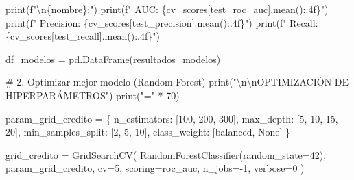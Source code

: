 \documentclass[
  doc,
  floatsintext,
  longtable,
  a4paper,
  nolmodern,
  notxfonts,
  notimes,
  12pt,
  colorlinks=true,linkcolor=blue,citecolor=blue,urlcolor=blue]{apa7}
\newenvironment{Shaded}{\begin{snugshade}}{\end{snugshade}}
\newcommand{\BuiltInTok}[1]{\textcolor[rgb]{0.00,0.23,0.31}{#1}}
\newcommand{\CharTok}[1]{\textcolor[rgb]{0.13,0.47,0.30}{#1}}
\newcommand{\CommentTok}[1]{\textcolor[rgb]{0.37,0.37,0.37}{#1}}
\newcommand{\DecValTok}[1]{\textcolor[rgb]{0.68,0.00,0.00}{#1}}
\newcommand{\NormalTok}[1]{\textcolor[rgb]{0.00,0.23,0.31}{#1}}
\newcommand{\OperatorTok}[1]{\textcolor[rgb]{0.37,0.37,0.37}{#1}}
\newcommand{\SpecialCharTok}[1]{\textcolor[rgb]{0.37,0.37,0.37}{#1}}
\newcommand{\SpecialStringTok}[1]{\textcolor[rgb]{0.13,0.47,0.30}{#1}}
\newcommand{\StringTok}[1]{\textcolor[rgb]{0.13,0.47,0.30}{#1}}
\newcommand{\VariableTok}[1]{\textcolor[rgb]{0.07,0.07,0.07}{#1}}
\begin{document}
\begin{Shaded}
\begin{Highlighting}[]
    \BuiltInTok{print}\NormalTok{(}\SpecialStringTok{f"}\CharTok{\textbackslash{}n}\SpecialCharTok{\{}\NormalTok{nombre}\SpecialCharTok{\}}\SpecialStringTok{:"}\NormalTok{)}
    \BuiltInTok{print}\NormalTok{(}\SpecialStringTok{f"  AUC: }\SpecialCharTok{\{}\NormalTok{cv\_scores[}\StringTok{\textquotesingle{}test\_roc\_auc\textquotesingle{}}\NormalTok{]}\SpecialCharTok{.}\NormalTok{mean()}\SpecialCharTok{:.4f\}}\SpecialStringTok{"}\NormalTok{)}
    \BuiltInTok{print}\NormalTok{(}\SpecialStringTok{f"  Precision: }\SpecialCharTok{\{}\NormalTok{cv\_scores[}\StringTok{\textquotesingle{}test\_precision\textquotesingle{}}\NormalTok{]}\SpecialCharTok{.}\NormalTok{mean()}\SpecialCharTok{:.4f\}}\SpecialStringTok{"}\NormalTok{)}
    \BuiltInTok{print}\NormalTok{(}\SpecialStringTok{f"  Recall: }\SpecialCharTok{\{}\NormalTok{cv\_scores[}\StringTok{\textquotesingle{}test\_recall\textquotesingle{}}\NormalTok{]}\SpecialCharTok{.}\NormalTok{mean()}\SpecialCharTok{:.4f\}}\SpecialStringTok{"}\NormalTok{)}

\NormalTok{df\_modelos }\OperatorTok{=}\NormalTok{ pd.DataFrame(resultados\_modelos)}

\CommentTok{\# 2. Optimizar mejor modelo (Random Forest)}
\BuiltInTok{print}\NormalTok{(}\StringTok{"}\CharTok{\textbackslash{}n\textbackslash{}n}\StringTok{OPTIMIZACIÓN DE HIPERPARÁMETROS"}\NormalTok{)}
\BuiltInTok{print}\NormalTok{(}\StringTok{"="} \OperatorTok{*} \DecValTok{70}\NormalTok{)}

\NormalTok{param\_grid\_credito }\OperatorTok{=}\NormalTok{ \{}
    \StringTok{\textquotesingle{}n\_estimators\textquotesingle{}}\NormalTok{: [}\DecValTok{100}\NormalTok{, }\DecValTok{200}\NormalTok{, }\DecValTok{300}\NormalTok{],}
    \StringTok{\textquotesingle{}max\_depth\textquotesingle{}}\NormalTok{: [}\DecValTok{5}\NormalTok{, }\DecValTok{10}\NormalTok{, }\DecValTok{15}\NormalTok{, }\DecValTok{20}\NormalTok{],}
    \StringTok{\textquotesingle{}min\_samples\_split\textquotesingle{}}\NormalTok{: [}\DecValTok{2}\NormalTok{, }\DecValTok{5}\NormalTok{, }\DecValTok{10}\NormalTok{],}
    \StringTok{\textquotesingle{}class\_weight\textquotesingle{}}\NormalTok{: [}\StringTok{\textquotesingle{}balanced\textquotesingle{}}\NormalTok{, }\VariableTok{None}\NormalTok{]}
\NormalTok{\}}

\NormalTok{grid\_credito }\OperatorTok{=}\NormalTok{ GridSearchCV(}
\NormalTok{    RandomForestClassifier(random\_state}\OperatorTok{=}\DecValTok{42}\NormalTok{),}
\NormalTok{    param\_grid\_credito,}
\NormalTok{    cv}\OperatorTok{=}\DecValTok{5}\NormalTok{,}
\NormalTok{    scoring}\OperatorTok{=}\StringTok{\textquotesingle{}roc\_auc\textquotesingle{}}\NormalTok{,}
\NormalTok{    n\_jobs}\OperatorTok{={-}}\DecValTok{1}\NormalTok{,}
\NormalTok{    verbose}\OperatorTok{=}\DecValTok{0}
\NormalTok{)}


\end{Highlighting}
\end{Shaded}
\end{document}
